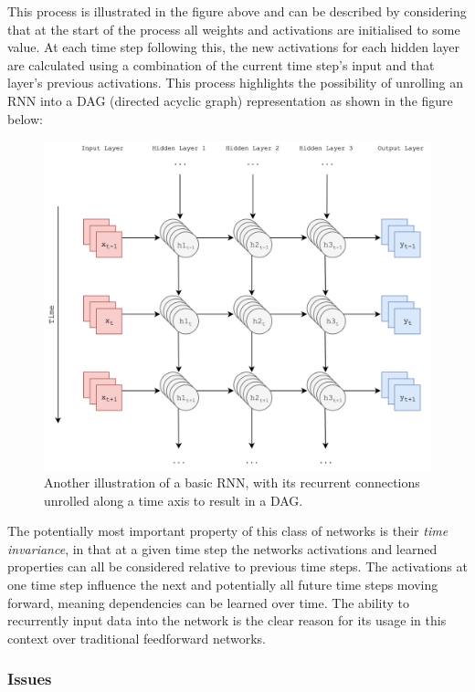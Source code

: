 \documentclass[12pt,]{article}
\begin{document}
This process is illustrated in the figure above and can be described by
considering that at the start of the process all weights and activations
are initialised to some value. At each time step following this, the new
activations for each hidden layer are calculated using a combination of
the current time step's input and that layer's previous activations.
This process highlights the possibility of unrolling an RNN into a DAG
(directed acyclic graph) representation as shown in the figure below:

\begin{figure}
\centering
\includegraphics{Images/unrolledrnn.png}
\caption{Another illustration of a basic RNN, with its recurrent
connections unrolled along a time axis to result in a DAG.}
\end{figure}

The potentially most important property of this class of networks is
their \emph{time invariance}, in that at a given time step the networks
activations and learned properties can all be considered relative to
previous time steps. The activations at one time step influence the next
and potentially all future time steps moving forward, meaning
dependencies can be learned over time. The ability to recurrently input
data into the network is the clear reason for its usage in this context
over traditional feedforward networks.

\hypertarget{issues}{%
\subsubsection{Issues}\label{issues}}
\end{document}
